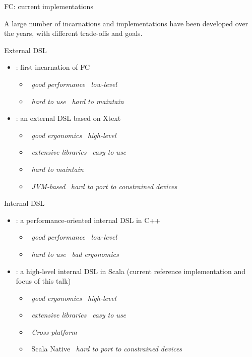 \documentclass[presentation, 9pt]{beamer}\mode<presentation>{\usetheme{AMSBolognaFC}}
\begin{document}
\begin{frame}[allowframebreaks]{FC: current implementations}
	\begin{center}
	A large number of incarnations and implementations have been developed over the years, with different trade-offs and goals.
	\end{center}
	\begin{exampleblock}{External DSL}
		\begin{itemize}
			\item {}: first incarnation of FC
			\begin{itemize}
				\item \faThumbsUp \, \emph{good performance} \faArrowRight \, \emph{low-level}
				\item \faThumbsDown \, \emph{hard to use} \faArrowRight \, \emph{hard to maintain}
			\end{itemize}
			\item {}: an external DSL based on Xtext
			\begin{itemize}
				\item \faThumbsUp \, \emph{good ergonomics} \faArrowRight \, \emph{high-level}
				\item \faThumbsUp \, \emph{extensive libraries} \faArrowRight \, \emph{easy to use}
				\item \faThumbsDown \, \emph{hard to maintain}
				\item \faThumbsDown \, \emph{JVM-based} \faArrowRight \, \emph{hard to port to constrained devices}
			\end{itemize}
		\end{itemize}
	\end{exampleblock}

	\begin{exampleblock}{Internal DSL}
		\begin{itemize}
			\item {}: a performance-oriented internal DSL in C++
			\begin{itemize}
				\item \faThumbsUp \, \emph{good performance} \faArrowRight \, \emph{low-level}
				\item \faThumbsDown \, \emph{hard to use} \faArrowRight \, \emph{bad ergonomics}
			\end{itemize}
			\item \underline{}: a high-level internal DSL in Scala (current reference implementation and focus of this talk)
			\begin{itemize}
				\item \faThumbsUp \, \emph{good ergonomics} \faArrowRight \, \emph{high-level}
				\item \faThumbsUp \, \emph{extensive libraries} \faArrowRight \, \emph{easy to use}
				\item \faThumbsUp \, \emph{Cross-platform}
				\item \faThumbsDown \, Scala Native \faArrowRight \, \emph{hard to port to constrained devices}
			\end{itemize}
		\end{itemize}
	\end{exampleblock}


\end{frame}
\end{document}
